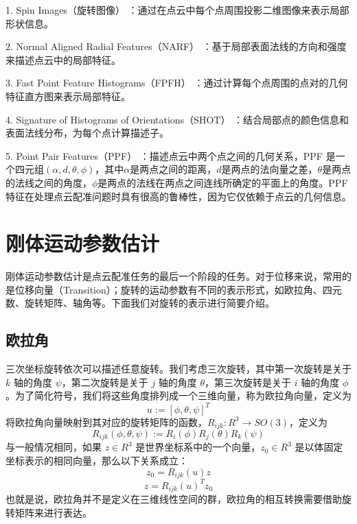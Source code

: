 1. Spin Images（旋转图像） \cite{johnson1997spin}：通过在点云中每个点周围投影二维图像来表示局部形状信息。

2. Normal Aligned Radial Features（NARF） \cite{steder2010narf}：基于局部表面法线的方向和强度来描述点云中的局部特征。

3. Fast Point Feature Histograms（FPFH） \cite{rusu2009fast}：通过计算每个点周围的点对的几何特征直方图来表示局部特征。

4. Signature of Histograms of Orientations（SHOT） \cite{salti2014shot}：结合局部点的颜色信息和表面法线分布，为每个点计算描述子。

5. Point Pair Features（PPF） \cite{deng2018ppfnet}：描述点云中两个点之间的几何关系，PPF 是一个四元组$(\alpha, d, \theta, \phi)$，其中$\alpha$是两点之间的距离，$d$是两点的法向量之差，$\theta$是两点的法线之间的角度，$\phi$是两点的法线在两点之间连线所确定的平面上的角度。PPF特征在处理点云配准问题时具有很高的鲁棒性，因为它仅依赖于点云的几何信息。

\section{刚体运动参数估计}
刚体运动参数估计是点云配准任务的最后一个阶段的任务。对于位移来说，常用的是位移向量（Transition）；旋转的运动参数有不同的表示形式，如欧拉角\cite{pio1966euler}、四元数\cite{shoemake1985animating}、旋转矩阵\cite{horn1954doubly}、轴角\cite{diebel2006representing}等。下面我们对旋转的表示进行简要介绍。

\subsection{欧拉角}
三次坐标旋转依次可以描述任意旋转。我们考虑三次旋转，其中第一次旋转是关于 $k$ 轴的角度 $\psi$，第二次旋转是关于 $j$ 轴的角度 $\theta$，第三次旋转是关于 $i$ 轴的角度 $\phi$。为了简化符号，我们将这些角度排列成一个三维向量，称为欧拉角向量，定义为 
\begin{equation}
    u := [\phi, \theta, \psi]^T
\end{equation}
将欧拉角向量映射到其对应的旋转矩阵的函数，$R_{ijk} : R^3 \to SO(3)$，定义为
\begin{equation}
    R_{ijk}(\phi, \theta, \psi) := R_i(\phi)R_j(\theta)R_k(\psi)
\end{equation}
与一般情况相同，如果 $z \in R^3$ 是世界坐标系中的一个向量，$z_0 \in R^3$ 是以体固定坐标表示的相同向量，那么以下关系成立：
\begin{equation}
    z_0 = R_{ijk}(u) z
\end{equation}
\begin{equation}
    z = R_{ijk}(u)^T z_0
\end{equation}
也就是说，欧拉角并不是定义在三维线性空间的群，欧拉角的相互转换需要借助旋转矩阵来进行表达。

